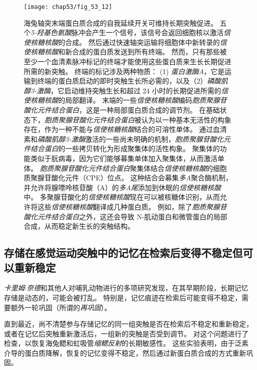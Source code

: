 \begin{figure}[htbp]
	\centering
	\texttt{[image: chap53/fig\_53\_12]}
	\caption{海兔轴突末端蛋白质合成的自我延续开关可维持长期突触促进。
		五个\textit{5-羟基色氨酸}脉冲会产生一个信号，该信号会返回细胞核以激活\textit{信使核糖核酸}的合成。
		然后通过快速轴突运输将细胞体中新转录的\textit{信使核糖核酸}和新合成的蛋白质发送到所有终端。
		然而，只有那些被至少一个血清素脉冲标记的终端才能使用这些蛋白质来生长长期促进所需的新突触。
		终端的标记涉及两种物质：
		(1) \textit{蛋白激酶A}，它是运输到终端的蛋白质启动的即时突触生长所必需的，以及（2）\textit{磷酸肌醇3-激酶}，它启动维持突触生长和超过 24 小时的长期促进所需的\textit{信使核糖核酸}的局部翻译。 末端的一些\textit{信使核糖核酸}编码\textit{胞质聚腺苷酸化元件结合蛋白}，这是一种局部蛋白质合成的调节剂。
		在基础状态下，\textit{胞质聚腺苷酸化元件结合蛋白}被认为以一种基本无活性的构象存在，作为一种不能与\textit{信使核糖核酸}结合的可溶性单体。
		通过血清素和\textit{磷酸肌醇3-激酶}激活的一些尚未明确的机制，\textit{胞质聚腺苷酸化元件结合蛋白}的一些拷贝转化为形成聚集体的活性构象。
		聚集体的功能类似于朊病毒，因为它们能够募集单体加入聚集体，从而激活单体。
		\textit{胞质聚腺苷酸化元件结合蛋白}聚集体结合\textit{信使核糖核酸}的细胞质聚腺苷酸化元件（CPE）位点。
		这种结合会募集\textit{多A}聚合酶机制，并允许将腺嘌呤核苷酸（A）的\textit{多A尾}添加到休眠的\textit{信使核糖核酸}中。
		多聚腺苷酸化的\textit{信使核糖核酸}现在可以被核糖体识别，从而允许将这些\textit{信使核糖核酸}翻译成几种蛋白质。
		例如，除了\textit{胞质聚腺苷酸化元件结合蛋白}之外，这还会导致 N-肌动蛋白和微管蛋白的局部合成，从而稳定新生长的突触结构\cite{bailey2004persistence}。}
	\label{fig:53_12}
\end{figure}


\subsection{存储在感觉运动突触中的记忆在检索后变得不稳定但可以重新稳定}

\textit{卡里姆$\cdot$奈德}和其他人对哺乳动物进行的多项研究发现，在其早期阶段，长期记忆存储是动态的，可能会被打乱。
特别是，记忆痕迹在检索后可能变得不稳定，需要额外一轮巩固（所谓的\textit{再巩固}）。


直到最近，尚不清楚参与存储记忆的同一组突触是否在检索后不稳定和重新稳定，或者在记忆后突触重新激活后，一组新的突触是否受到调节。
对这个问题进行了检查，以恢复海兔鳃和虹吸管\textit{缩鳃反射}的长期敏感性。
这些实验表明，由于泛素介导的蛋白质降解，恢复的记忆变得不稳定，然后通过新蛋白质合成的方式重新巩固。


